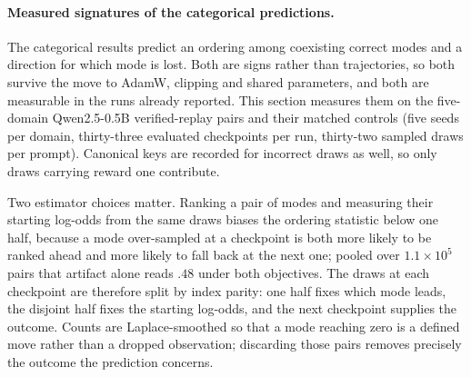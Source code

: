 \paragraph{Measured signatures of the categorical predictions.}
The categorical results predict an ordering among coexisting correct modes and
a direction for which mode is lost. Both are signs rather than trajectories, so
both survive the move to AdamW, clipping and shared parameters, and both are
measurable in the runs already reported. This section measures them on the
five-domain Qwen2.5-0.5B verified-replay pairs and their matched controls
(five seeds per domain, thirty-three evaluated checkpoints per run, thirty-two
sampled draws per prompt). Canonical keys are recorded for incorrect draws as
well, so only draws carrying reward one contribute.

Two estimator choices matter. Ranking a pair of modes and measuring their
starting log-odds from the same draws biases the ordering statistic below one
half, because a mode over-sampled at a checkpoint is both more likely to be
ranked ahead and more likely to fall back at the next one; pooled over
$1.1\times10^5$ pairs that artifact alone reads $.48$ under both objectives.
The draws at each checkpoint are therefore split by index parity: one half
fixes which mode leads, the disjoint half fixes the starting log-odds, and the
next checkpoint supplies the outcome. Counts are Laplace-smoothed so that a
mode reaching zero is a defined move rather than a dropped observation;
discarding those pairs removes precisely the outcome the prediction concerns.

